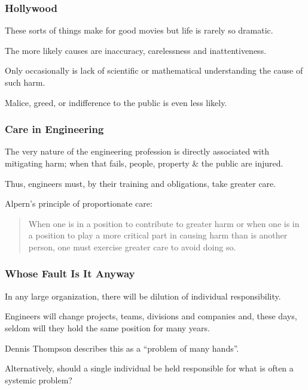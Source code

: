 \begin{frame}
\frametitle{Hollywood}

These sorts of things make for good movies but life is rarely so dramatic.

The more likely causes are inaccuracy, carelessness and inattentiveness.

Only occasionally is lack of scientific or mathematical understanding the cause of such harm. 

Malice, greed, or indifference to the public is even less likely.


\end{frame}



\begin{frame}
\frametitle{Care in Engineering}

The very nature of the engineering profession is directly associated with mitigating harm; when that fails, people, property \& the public are injured. 

Thus, engineers must, by their training and obligations, take greater care.

Alpern's principle of proportionate care:
\begin{quote}
When one is in a  position to contribute to greater harm or when one is in a position to play a more critical part in causing harm than is another person, one must exercise greater care to avoid doing so.
\end{quote}

\end{frame}




\begin{frame}
\frametitle{Whose Fault Is It Anyway}

In any large organization, there will be dilution of individual responsibility.

Engineers will change projects, teams, divisions and companies and, these days, seldom will they hold the same position for many years.


Dennis Thompson describes this as a ``problem of many hands''.


Alternatively, should a single individual be held responsible for what is often a systemic problem?



\end{frame}


